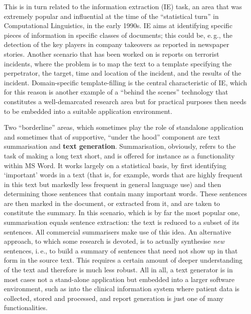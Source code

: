 \begin{multicols}{2}

This is in turn related to the information extraction (IE) task, an area that was extremely popular and influential at the time of the ``statistical turn'' in Computational Linguistics, in the early 1990s. IE aims at identifying specific pieces of information in specific classes of documents; this could be, e.\,g., the detection of the key players in company takeovers as reported in newspaper stories. Another scenario that has been worked on is reports on terrorist incidents, where the problem is to map the text to a template specifying the perpetrator, the target, time and location of the incident, and the results of the incident. Domain-specific template-filling is the central characteristic of IE, which for this reason is another example of a ``behind the scenes'' technology that constitutes a well-demarcated research area but for practical purposes then needs to be embedded into a suitable application environment. 

Two ``borderline'' areas, which sometimes play the role of standalone application and sometimes that of supportive, ``under the hood'' component are text summarisation and \textbf{text generation}. Summarisation, obviously, refers to the task of making a long text short, and is offered for instance as a functionality within MS Word. It works largely on a statistical basis, by first identifying `important' words in a text (that is, for example, words that are highly frequent in this text but markedly less frequent in general language use) and then determining those sentences that contain many important words. These sentences are then marked in the document, or extracted from it, and are taken to constitute the summary. In this scenario, which is by far the most popular one, summarisation equals sentence extraction: the text is reduced to a subset of its sentences. All commercial summarisers make use of this idea. An alternative approach, to which some research is devoted, is to actually synthesise \emph{new} sentences, i.\,e., to build a summary of sentences that need not show up in that form in the source text. This requires a certain amount of deeper understanding of the text and therefore is much less robust. All in all, a text generator is in most cases not a stand-alone application but embedded into a larger software environment, such as into the clinical information system where patient data is collected, stored and processed, and report generation is just one of many functionalities.


\end{multicols}
